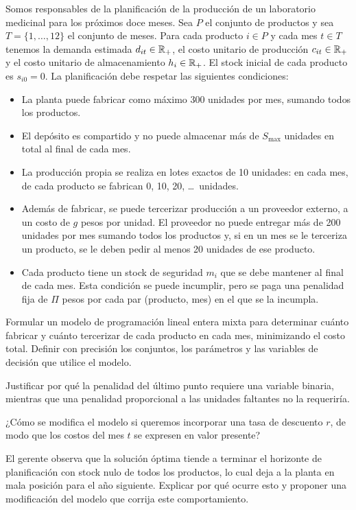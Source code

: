 \documentclass[11pt,a4paper]{article}
\begin{document}
\newpage
Somos responsables de la planificación de la producción de un laboratorio
medicinal para los próximos doce meses. Sea $P$ el conjunto de productos y sea
$T = \{1,\dots,12\}$ el conjunto de meses. Para cada producto $i \in P$ y cada
mes $t \in T$ tenemos la demanda estimada $d_{it} \in \mathbb{R}_+$, el costo unitario de
producción $c_{it} \in \mathbb{R}_+$ y el costo unitario de almacenamiento
$h_i \in \mathbb{R}_+$. El stock inicial de cada producto es $s_{i0} = 0$. La
planificación debe respetar las siguientes condiciones:

\begin{itemize}
  \item La planta puede fabricar como máximo 300 unidades por mes, sumando todos
  los productos.
  \item El depósito es compartido y no puede almacenar más de $S_{\max}$
  unidades en total al final de cada mes.
  \item La producción propia se realiza en lotes exactos de 10 unidades: en cada
  mes, de cada producto se fabrican 0, 10, 20, \dots\ unidades.
  \item Además de fabricar, se puede tercerizar producción a un proveedor
  externo, a un costo de $g$ pesos por unidad. El proveedor no puede entregar
  más de 200 unidades por mes sumando todos los productos y, si en un mes se le
  terceriza un producto, se le deben pedir al menos 20 unidades de ese producto.
  \item Cada producto tiene un stock de seguridad $m_i$ que se debe mantener al
  final de cada mes. Esta condición se puede incumplir, pero se paga una
  penalidad fija de $\Pi$ pesos por cada par (producto, mes) en el que se la
  incumpla.
\end{itemize}

\begin{puntos}
  \item Formular un modelo de programación lineal entera mixta para determinar
  cuánto fabricar y cuánto tercerizar de cada producto en cada mes, minimizando
  el costo total. Definir con precisión los conjuntos, los parámetros y las
  variables de decisión que utilice el modelo.

  \item Justificar por qué la penalidad del último punto requiere una variable
  binaria, mientras que una penalidad proporcional a las unidades faltantes no
  la requeriría.

  \item ¿Cómo se modifica el modelo si queremos incorporar una tasa de descuento
  $r$, de modo que los costos del mes $t$ se expresen en valor presente?

  \item El gerente observa que la solución óptima tiende a terminar el horizonte
  de planificación con stock nulo de todos los productos, lo cual deja a la
  planta en mala posición para el año siguiente. Explicar por qué ocurre esto y
  proponer una modificación del modelo que corrija este comportamiento.
\end{puntos}
\end{document}
